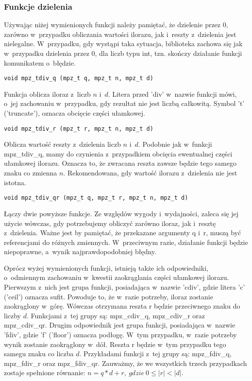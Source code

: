 \subsubsection{Funkcje dzielenia}
Używając niżej wymienionych funkcji należy pamiętać, że dzielenie przez $0$, zarówno w~przypadku obliczania wartości ilorazu, jak i~reszty z~dzielenia jest nielegalne. W~przypadku, gdy wystąpi taka sytuacja, biblioteka zachowa się jak w~przypadku dzielenia przez $0$, dla liczb typu int, tzn. skończy działanie funkcji komunikatem o~błędzie.

\begin{lstlisting}
void mpz_tdiv_q (mpz_t q, mpz_t n, mpz_t d)
\end{lstlisting}

Funkcja oblicza iloraz z~liczb $n$ i~$d$. Litera przed 'div' w~nazwie funkcji mówi, o~jej zachowaniu w~przypadku, gdy rezultat nie jest liczbą całkowitą. Symbol 't' ('truncate'), oznacza obcięcie części ułamkowej.

\begin{lstlisting}
void mpz_tdiv_r (mpz_t r, mpz_t n, mpz_t d)
\end{lstlisting}

Oblicza wartość reszty z~dzielenia liczb $n$ i~$d$. Podobnie jak w~funkcji mpz\_tdiv\_q, mamy do czynienia z~przypadkiem obcięcia ewentualnej części ułamkowej ilorazu. Oznacza to, że zwracana reszta zawsze będzie tego samego znaku co zmienna $n$. Rekomendowana, gdy wartość ilorazu z~dzielenia nie jest istotna.

\begin{lstlisting}
void mpz_tdiv_qr (mpz_t q, mpz_t r, mpz_t n, mpz_t d)
\end{lstlisting}

Łączy dwie powyższe funkcje. Ze względów wygody i~wydajności, zaleca się jej użycie wówczas, gdy potrzebujemy obliczyć zarówno iloraz, jak i~resztę z~dzielenia. Ważne jest by pamiętać, że przekazane argumenty q i~r, muszą być referencjami do różnych zmiennych. W~przeciwnym razie, działanie funkcji będzie niepoprawne, a~wynik najprawdopodobniej błędny.

Oprócz wyżej wymienionych funkcji, istnieją także ich odpowiedniki, o~odmiennym zachowaniu w~kwestii zaokrąglania części ułamkowej ilorazu. Pierwszym z~nich jest grupa funkcji, posiadająca w~nazwie 'cdiv', gdzie litera 'c' ('ceil') oznacza sufit. Powoduje to, że w~razie potrzeby, iloraz zostanie zaokrąglony w~górę. Wówczas otrzymana reszta r będzie przeciwnego znaku do liczby $d$. Funkcjami z~tej grupy są: mpz\_cdiv\_q, mpz\_cdiv\_r oraz mpz\_cdiv\_qr. Drugim odpowiednik jest grupa funkcji, posiadająca w~nazwie 'fdiv', gdzie 'f' ('floor') oznacza podłogę. W~tym przypadku, w~razie potrzeby wynik zostanie zaokrąglony w~dół. Reszta r będzie w~tym przypadku tego samegu znaku co liczba $d$. Przykładami funkcji z~tej grupy są: mpz\_fdiv\_q, mpz\_fdiv\_r oraz mpz\_fdiv\_qr. Zauważmy, że we wszystkich trzech przypadkach zostaje spełnione równanie: $n = q*d+r,\ gdzie\ 0 \le |r| < |d|.$


